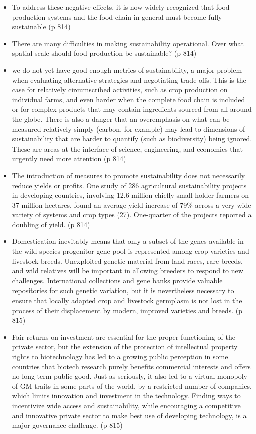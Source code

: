 \documentclass[twoside]{article}	%
\begin{document}
\begin{itemize}
  \item To address these negative effects, it is now widely recognized that food production systems and the food chain in general must become fully sustainable (p 814)
  \item There are many difficulties in making sustainability operational. Over what spatial scale should food production be sustainable? (p 814)
  \item we do not yet have good enough metrics of sustainability, a major problem when evaluating alternative strategies and negotiating trade-offs. This is the case for relatively circumscribed activities, such as crop production on individual farms, and even harder when the complete food chain is included or for complex products that may contain ingredients sourced from all around the globe. There is also a danger that an overemphasis on what can be measured relatively simply (carbon, for example) may lead to dimensions of sustainability that are harder to quantify (such as biodiversity) being ignored. These are areas at the interface of science, engineering, and economics that urgently need more attention (p 814)
  \item The introduction of measures to promote sustainability does not necessarily reduce yields or profits. One study of 286 agricultural sustainability projects in developing countries, involving 12.6 million chiefly small-holder farmers on 37 million hectares, found an average yield increase of 79\% across a very wide variety of systems and crop types (27). One-quarter of the projects reported a doubling of yield. (p 814)
  \item Domestication inevitably means that only a subset of the genes available in the wild-species progenitor gene pool is represented among crop varieties and livestock breeds. Unexploited genetic material from land races, rare breeds, and wild relatives will be important in allowing breeders to respond to new challenges. International collections and gene banks provide valuable repositories for such genetic variation, but it is nevertheless necessary to ensure that locally adapted crop and livestock germplasm is not lost in the process of their displacement by modern, improved varieties and breeds. (p 815)
  \item Fair returns on investment are essential for the proper functioning of the private sector, but the extension of the protection of intellectual property rights to biotechnology has led to a growing public perception in some countries that biotech research purely benefits commercial interests and offers no long-term public good. Just as seriously, it also led to a virtual monopoly of GM traits in some parts of the world, by a restricted number of companies, which limits innovation and investment in the technology. Finding ways to incentivize wide access and sustainability, while encouraging a competitive and innovative private sector to make best use of developing technology, is a major governance challenge. (p 815)

\end{itemize}
\end{document}
